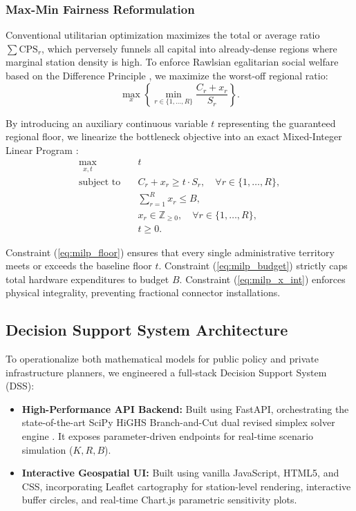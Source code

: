 \documentclass[conference]{IEEEtran}
\begin{document}
\subsubsection{Max-Min Fairness Reformulation}
Conventional utilitarian optimization maximizes the total or average ratio $\sum \text{CPS}_r$, which perversely funnels all capital into already-dense regions where marginal station density is high. To enforce Rawlsian egalitarian social welfare based on the Difference Principle \cite{rawls1971theory}, we maximize the worst-off regional ratio:
\begin{equation}
\max_{x} \left\{ \min_{r \in \{1, \dots, R\}} \frac{C_r + x_r}{S_r} \right\}.
\end{equation}

By introducing an auxiliary continuous variable $t$ representing the guaranteed regional floor, we linearize the bottleneck objective into an exact Mixed-Integer Linear Program \cite{ogryczak2014fair}:
\begin{align}
\max_{x, t} \quad & t \label{eq:milp_obj} \\
\text{subject to} \quad & C_r + x_r \ge t \cdot S_r, \quad \forall r \in \{1, \dots, R\}, \label{eq:milp_floor} \\
& \sum_{r=1}^{R} x_r \le B, \label{eq:milp_budget} \\
& x_r \in \mathbb{Z}_{\ge 0}, \quad \forall r \in \{1, \dots, R\}, \label{eq:milp_x_int} \\
& t \ge 0. \label{eq:milp_t_pos}
\end{align}

Constraint (\ref{eq:milp_floor}) ensures that every single administrative territory meets or exceeds the baseline floor $t$. Constraint (\ref{eq:milp_budget}) strictly caps total hardware expenditures to budget $B$. Constraint (\ref{eq:milp_x_int}) enforces physical integrality, preventing fractional connector installations.

\subsection{Decision Support System Architecture}
To operationalize both mathematical models for public policy and private infrastructure planners, we engineered a full-stack Decision Support System (DSS):
\begin{itemize}
    \item \textbf{High-Performance API Backend:} Built using FastAPI, orchestrating the state-of-the-art SciPy HiGHS Branch-and-Cut dual revised simplex solver engine \cite{huangfu2018parallelizing}. It exposes parameter-driven endpoints for real-time scenario simulation ($K, R, B$).
    \item \textbf{Interactive Geospatial UI:} Built using vanilla JavaScript, HTML5, and CSS, incorporating Leaflet cartography for station-level rendering, interactive buffer circles, and real-time Chart.js parametric sensitivity plots.
\end{itemize}
\end{document}
